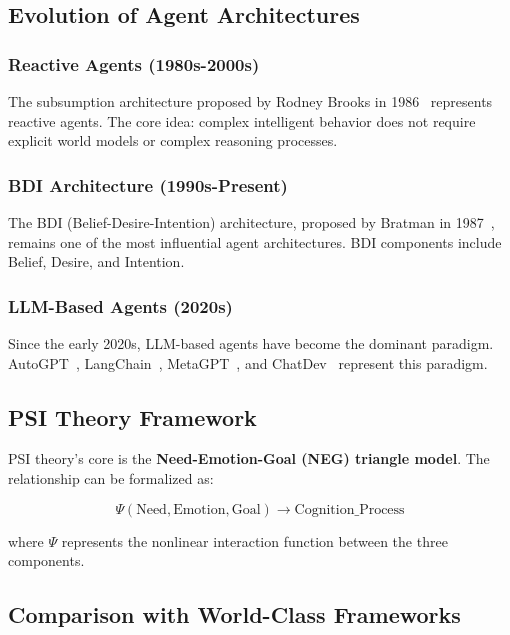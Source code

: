 \documentclass[10pt,twocolumn,letterpaper]{article}
\begin{document}
\subsection{Evolution of Agent Architectures}
\label{ssec:agent_arch_evolution}

\subsubsection{Reactive Agents (1980s-2000s)}
The subsumption architecture proposed by Rodney Brooks in 1986~\citep{Brooks1986} represents reactive agents. The core idea: complex intelligent behavior does not require explicit world models or complex reasoning processes.

\subsubsection{BDI Architecture (1990s-Present)}
The BDI (Belief-Desire-Intention) architecture, proposed by Bratman in 1987~\citep{Bratman1987}, remains one of the most influential agent architectures. BDI components include Belief, Desire, and Intention.

\subsubsection{LLM-Based Agents (2020s)}
Since the early 2020s, LLM-based agents have become the dominant paradigm. AutoGPT~\citep{AutoGPT2023}, LangChain~\citep{LangChain2023}, MetaGPT~\citep{Hong2023}, and ChatDev~\citep{ChatDev2023} represent this paradigm.

\subsection{PSI Theory Framework}
\label{ssec:psi_theory}

PSI theory's core is the \textbf{Need-Emotion-Goal (NEG) triangle model}. The relationship can be formalized as:

\begin{equation}
    \Psi(\text{Need}, \text{Emotion}, \text{Goal}) \rightarrow \text{Cognition\_Process}
    \label{eq:psi_formalization}
\end{equation}

where $\Psi$ represents the nonlinear interaction function between the three components.

\subsection{Comparison with World-Class Frameworks}
\label{ssec:framework_comparison}
\end{document}
